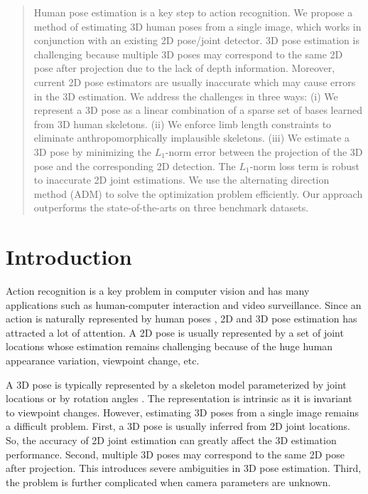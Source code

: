 \documentclass[10pt,twocolumn,letterpaper]{article}
\begin{document}
\begin{abstract}
Human pose estimation is a key step to action recognition. We propose a method of estimating 3D human poses from a single image, which works in conjunction with an existing 2D pose/joint detector. 3D pose estimation is challenging because multiple 3D poses may correspond to the same 2D pose after projection due to the lack of depth information. Moreover, current 2D pose estimators are usually inaccurate which may cause errors in the 3D estimation. We address the challenges in three ways: (i) We represent a 3D pose as a linear combination of a sparse set of bases learned from 3D human skeletons. (ii) We enforce limb length constraints to eliminate anthropomorphically implausible skeletons. (iii) We estimate a 3D pose by minimizing the $L_1$-norm error between the projection of the 3D pose and the corresponding 2D detection. The $L_1$-norm loss term is robust to inaccurate 2D joint estimations. We use the alternating direction method (ADM) to solve the optimization problem efficiently. Our approach outperforms the state-of-the-arts on three benchmark datasets.
\end{abstract}



\section{Introduction}
Action recognition is a key problem in computer vision \cite{wang2011mining} and has many applications such as human-computer interaction and video surveillance. Since an action is naturally represented by human poses \cite{ChunyuCVPR13}, 2D and 3D pose estimation has attracted a lot of attention. A 2D pose is usually represented by a set of joint locations \cite{Yang2D} whose estimation remains challenging because of the huge human appearance variation, viewpoint change, etc.

A 3D pose is typically represented by a skeleton model parameterized by joint locations \cite{Taylor} or by rotation angles \cite{lee2009human}. The representation is intrinsic as it is invariant to viewpoint changes. However, estimating 3D poses from a single image remains a difficult problem. First, a 3D pose is usually inferred from 2D joint locations. So, the accuracy of 2D joint estimation can greatly affect the 3D estimation performance. Second, multiple 3D poses may correspond to the same 2D pose after projection. This introduces severe ambiguities in 3D pose estimation. Third, the problem is further complicated when camera parameters are unknown.
\end{document}
